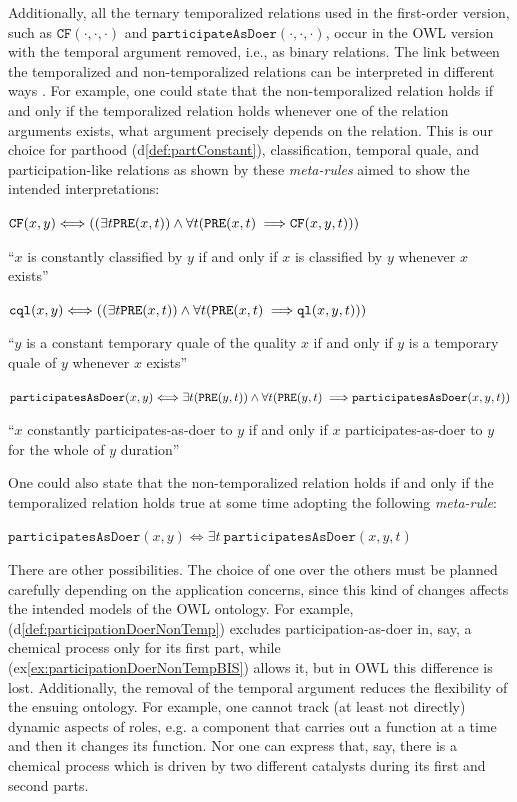 \documentclass[sw]{iosart2x}
\newcommand{\bflist}{\begin{list}{}{\setlength{\topsep}{2mm}\setlength{\partopsep}{0mm}\setlength{\parsep}{0mm}\setlength{\leftmargin}{9mm}\setlength{\labelwidth}{8mm}}}
\newcommand{\eflist}{\end{list}}
\newcommand{\DefLabel}{\textrm{d}}
\newcommand{\ExLabel}{\textrm{ex}}
\newcounter{cntdef}
\newcommand{\mydf}[1]{\refstepcounter{cntdef}\begin{small}{\bf \DefLabel\thecntdef\label{def:#1}}\end{small}}
\newcommand{\myex}[1]{\refstepcounter{cntex}\begin{small}{\bf \ExLabel\thecntex\label{ex:#1}}\end{small}}
\newcounter{cntex}
\newcommand{\mytext}[1]{``#1''}
\newcommand{\refdf}[1]{({\DefLabel}\ref{#1})}
\newcommand{\refex}[1]{({\ExLabel}\ref{#1})}
\newcommand{\generalStyle}[1]{\texttt{#1}}
\newcommand{\biRel}[3]{\generalStyle{#1}(#2,#3)}
\newcommand{\triRel}[4]{\generalStyle{#1}(#2,#3,#4)}
\newcommand{\myiff}{\Longleftrightarrow}
\newcommand{\myfi}{\hspace{0.9mm} \Longrightarrow}
\newcommand{\OWL}{\textnormal{OWL}\xspace}
\newcommand{\DOLCEQualeDirect}[2]{\biRel{{cql}}{#1}{#2}}
\newcommand{\DOLCECLbyBinary}[2]{\biRel{CF}{#1}{#2}}
\newcommand{\DOLCECLby}[3]{\triRel{CF}{#1}{#2}{#3}}
\newcommand{\DOLCEPRE}[2]{\biRel{PRE}{#1}{#2}}
\newcommand{\participateAsDoer}[3]{\triRel{participatesAsDoer}{#1}{#2}{#3}}
\newcommand{\participateAsDoerBinary}[2]{\biRel{participatesAsDoer}{#1}{#2}}
\newcommand{\DOLCEQualeTer}[3]{\triRel{ql}{#1}{#2}{#3}}
\begin{document}
Additionally, all the ternary temporalized relations used in the first-order version, such as $\DOLCECLby{\cdot}{\cdot}{\cdot}$ 
and $\hspace{0pt}\texttt{participateAsDoer}(\cdot,\cdot,\cdot)$, occur in the \OWL version with the temporal argument removed, i.e., as binary relations.
The link between the temporalized and non-temporalized relations can be interpreted in different ways \cite{TerkajOntologyIndustrialEngineering2022}. For example, one could state that the non-temporalized relation holds if and only if the temporalized relation holds whenever one of the relation arguments exists, what argument precisely depends on the relation. This is our choice for parthood \refdf{def:partConstant}, classification, temporal quale, and participation-like relations as shown by these \textit{meta-rules} aimed to show the intended interpretations: 
\bflist
\item[\mydf{CLnontemp}$_{meta}$] $ \DOLCECLbyBinary{x}{y} \myiff ((\exists t \DOLCEPRE{x}{t}) \land \forall t (\DOLCEPRE{x}{t} \myfi  \DOLCECLby{x}{y}{t}))$ 
\item \mytext{$x$ is constantly classified by $y$ if and only if $x$ is classified by $y$ whenever $x$ exists}
\item[\mydf{Qualenontemp}$_{meta}$] $ \DOLCEQualeDirect{x}{y} \myiff ((\exists t \DOLCEPRE{x}{t}) \land \forall t (\DOLCEPRE{x}{t} \myfi  \DOLCEQualeTer{x}{y}{t}))$ 
\item \mytext{$y$ is a constant temporary quale of the quality $x$ if and only if $y$ is a temporary quale of $y$ whenever $x$ exists}
\item[\mydf{participationDoerNonTemp}$_{meta}$] $ \participateAsDoerBinary{x}{y} \myiff \exists t (\DOLCEPRE{y}{t}) \land \forall t (\DOLCEPRE{y}{t} \myfi \participateAsDoer{x}{y}{t})$
\item \mytext{$x$ constantly participates-as-doer to $y$ if and only if $x$ participates-as-doer to $y$ for the whole of $y$ duration}
\eflist
One could also state that the non-temporalized relation holds if and only if the temporalized relation holds true at some time adopting the following \textit{meta-rule}: 
\bflist
\item[\myex{participationDoerNonTempBIS}$_{meta}$] $ \participateAsDoerBinary{x}{y} \myiff \exists t ~\participateAsDoer{x}{y}{t}$
\eflist
There are other possibilities. The choice of one over the others must be planned carefully depending on the application concerns, since this kind of changes affects the intended models of the \OWL ontology. For example, \refdf{def:participationDoerNonTemp} excludes participation-as-doer in, say, a chemical process only for its first part, while \refex{ex:participationDoerNonTempBIS} allows it, but in \OWL this difference is lost.
Additionally, the removal of the temporal argument reduces the flexibility of the ensuing ontology. For example, one cannot track (at least not directly) dynamic aspects of roles, e.g. a component that carries out a function at a time and then it changes its function. Nor one can express that, say, there is a chemical process which is driven by two different catalysts during its first and second parts.
\end{document}
